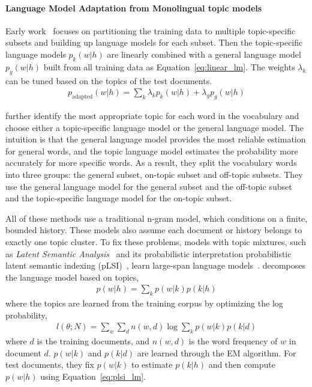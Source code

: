 
\paragraph{Language Model Adaptation from Monolingual topic models}

Early work~\citet{Clarkson-1997,Seymore-1997,Kneser-1997,Iyer-1999} focuses on
partitioning the training data to multiple topic-specific subsets and
building up language models for each subset. Then the topic-specific
language models $p_k(w|h)$ are linearly combined with a general
language model $p_g(w|h)$ built from all training data as
Equation~\ref{eq:linear_lm}. The weights $\lambda_k$ can be tuned
based on the topics of the test documents.
\begin{align}
\label{eq:linear_lm}
p_\textrm{adapted}(w|h) = \sum_k \lambda_k p_k(w|h) + \lambda_g p_g(w|h)
\end{align}

\citet{Seymore-1998} further identify the most appropriate topic for
each word in the vocabulary and choose either a topic-specific language model
or the general language model. The intuition is that the general
language model provides the most reliable estimation for general
words, and the topic language model estimates the probability more
accurately for more specific words. As a result, they split the vocabulary
words into three groups: the general subset, on-topic subset and
off-topic subsets. They use the general language model for the general subset and the off-topic subset and the topic-specific language model for  the
on-topic subset.

All of these methods use a traditional n-gram model, which conditions on a finite, bounded history.
These models also assume each document or history belongs
to exactly one topic cluster.
To fix these problems, models with topic mixtures, such as
\emph{Latent Semantic Analysis}~\citep[\textsc{lsa}]{deerwester-90}
and its probabilistic interpretation probabilistic latent semantic
indexing (pLSI)~\citep[\textsc{plsi}]{hofmann-99},
learn large-span language
models~\citep{Bellegarda-1997,Coccaro-1998,Gildea-1999}. \citet{Gildea-1999}
decomposes the language model based on topics,
\begin{align}
\label{eq:plsi_lm}
p(w|h) = \sum_k p(w|k) p(k|h)
\end{align}
where the topics are learned from the training corpus by optimizing the log probability,
\begin{align}
l(\theta; N) = \sum_w \sum_d n(w,d) \log \sum_k p(w|k) p(k|d)
\end{align}
where $d$ is the training documents, and $n(w,d)$ is the word frequency of $w$ in document $d$. $p(w|k)$ and $p(k|d)$ are learned through the EM algorithm. For test documents, they fix $p(w|k)$ to estimate $p(k|h)$ and then compute $p(w|h)$ using Equation~\ref{eq:plsi_lm}. 

